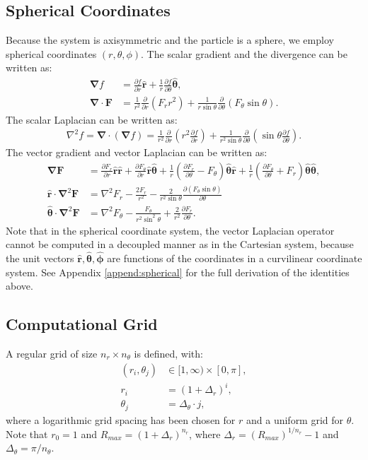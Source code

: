 \documentclass[MSc,beforeExam]{iitcsthesis}
\newcommand{\deriv}[2]{\frac{\partial #1}{\partial #2}}
\newcommand{\pars}[1]{\left(#1\right)}
\newcommand\Laplacian{\nabla^2}
\newcommand\bnabla{\boldsymbol{\nabla}}
\newcommand\bLaplacian{\boldsymbol{\nabla}^2}
\newcommand\bF{\boldsymbol{F}}
\newcommand\br{\boldsymbol{r}}
\newcommand\brhat{\hat{\br}}
\newcommand\btheta{\boldsymbol{\theta}}
\newcommand\bthetahat{\hat{\btheta}}
\newcommand\bphi{\boldsymbol{\phi}}
\newcommand\bphihat{\hat{\bphi}}
\begin{document}
\subsection{Spherical Coordinates}
Because the system is axisymmetric and the particle is a sphere, we employ
spherical coordinates $(r,\theta,\phi)$.
The scalar gradient and the divergence can be written as:
\begin{align}
\bnabla f &= \deriv{f}{r}\brhat + \frac{1}{r}\deriv{f}{\theta}\bthetahat, \\
\bnabla \cdot \bF &= \frac{1}{r^2}\deriv{}{r}\pars{F_r r^2 } + 
               \frac{1}{r \sin\theta}\deriv{}{\theta}\pars{F_\theta \sin\theta}.
\end{align}
The scalar Laplacian can be written as:
\begin{align}
\Laplacian f = \bnabla \cdot (\bnabla f) = 
 \frac{1}{r^2}\deriv{}{r}\pars{r^2 \deriv{f}{r}} + 
 \frac{1}{r^2 \sin\theta}\deriv{}{\theta}\pars{\sin\theta \deriv{f}{\theta}}.
\end{align}
The vector gradient and vector Laplacian can be written as:
\begin{align}
\nonumber
\bnabla \bF &= \deriv{F_r}{r} \brhat \brhat + \deriv{F_\theta}{r} \brhat \bthetahat + 
\frac{1}{r}\pars{\deriv{F_r}{\theta} - F_\theta} \bthetahat \brhat + 
\frac{1}{r}\pars{\deriv{F_\theta}{\theta} + F_r} \bthetahat \bthetahat, 
\\
\brhat \cdot \bLaplacian \bF &=
\Laplacian F_r - \frac{2F_r}{r^2} - 
\frac{2}{r^2 \sin\theta} \deriv{\left(F_\theta \sin\theta \right)}{\theta}
\\
\nonumber
\bthetahat \cdot \bLaplacian \bF &= 
\Laplacian F_\theta - \frac{F_\theta}{r^2 \sin^2\theta} + 
\frac{2}{r^2}\deriv{F_r}{\theta}.
\end{align}
Note that in the spherical coordinate system,
the vector Laplacian operator cannot be computed in a decoupled manner as in the Cartesian system,
because the unit vectors $\brhat, \bthetahat, \bphihat$ are functions of the coordinates
in a curvilinear coordinate system.
See Appendix \ref{append:spherical} for the full derivation of the identities above.


\subsection{Computational Grid}
A regular grid of size $n_r \times n_\theta$ is defined, with:
\begin{align} \label{eq:grid}
\nonumber
(r_i,\theta_j) &\in [1, \infty) \times [0,\pi], \\ 
r_i &= (1+\Delta_r)^i, \\
\nonumber
\theta_j &= \Delta_\theta \cdot j,
\end{align}
where a logarithmic grid spacing has been chosen for $r$ and a uniform grid for $\theta$.
Note that $r_0 = 1$ and $R_{max} = (1+\Delta_r)^{n_r}$, where
$\Delta_r = \pars{R_{max}} ^ {1/n_r} - 1$ and $\Delta_\theta = {\pi/n_\theta}$.
\end{document}
